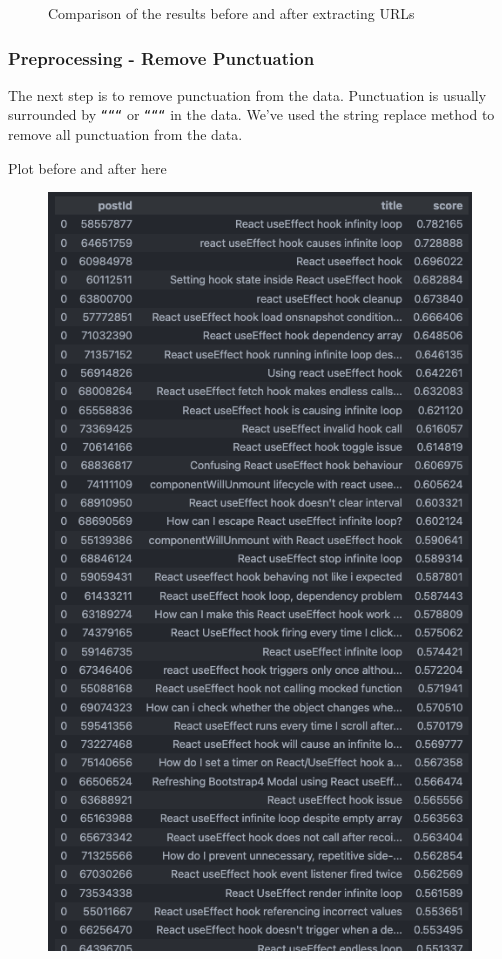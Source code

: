\begin{figure}[H]
\caption{Comparison of the results before and after extracting URLs }\label{url_extract_comparison}
\end{figure}

\subsubsection{Preprocessing - Remove Punctuation}
The next step is to remove punctuation from the data. Punctuation is usually surrounded by \texttt{``````} or \texttt{``````} in the data. We've used the string replace method to remove all punctuation from the data.

Plot before and after here
\begin{figure}[H]
  \noindent \includegraphics[scale=0.45]{assets/spacy-query-1-results.png}

\end{figure}
